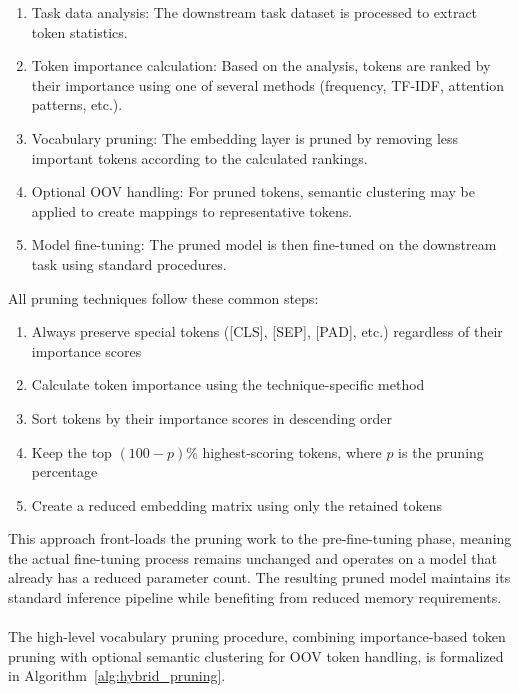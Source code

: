 \documentclass[twocolumn]{article}
\begin{document}
\begin{enumerate}
    \item Task data analysis: The downstream task dataset is processed to extract token statistics.
    \item Token importance calculation: Based on the analysis, tokens are ranked by their importance using one of several methods (frequency, TF-IDF, attention patterns, etc.).
    \item Vocabulary pruning: The embedding layer is pruned by removing less important tokens according to the calculated rankings.
    \item Optional OOV handling: For pruned tokens, semantic clustering may be applied to create mappings to representative tokens.
    \item Model fine-tuning: The pruned model is then fine-tuned on the downstream task using standard procedures.
\end{enumerate}
All pruning techniques follow these common steps:
\begin{enumerate}
    \item Always preserve special tokens ([CLS], [SEP], [PAD], etc.) regardless of their importance scores
    \item Calculate token importance using the technique-specific method
    \item Sort tokens by their importance scores in descending order
    \item Keep the top $(100-p)\%$ highest-scoring tokens, where $p$ is the pruning percentage
    \item Create a reduced embedding matrix using only the retained tokens
\end{enumerate}
This approach front-loads the pruning work to the pre-fine-tuning phase, meaning the actual fine-tuning process remains unchanged and operates on a model that already has a reduced parameter count. The resulting pruned model maintains its standard inference pipeline while benefiting from reduced memory requirements.
\\ \\
The high-level vocabulary pruning procedure, combining importance-based token pruning with optional semantic clustering for OOV token handling, is formalized in Algorithm~\ref{alg:hybrid_pruning}.
\\ \\
\end{document}
